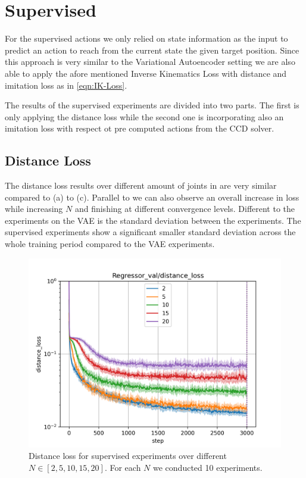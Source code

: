 \section{Supervised}

For the supervised actions we only relied on state information as the input to predict an action to reach from the current state the given target position.  Since this approach is very similar to the Variational Autoencoder setting we are also able to apply the afore mentioned Inverse Kinematics Loss with distance and imitation loss as in \eqref{eqn:IK-Loss}.

The results of the supervised experiments are divided into two parts. The first is only applying the distance loss while the second one is incorporating also an imitation loss with respect ot pre computed actions from the CCD solver.

\subsection{Distance Loss}

The distance loss results over different amount of joints in  are very similar compared to  (a) to (c). Parallel to  we can also observe an overall increase in loss while increasing $N$ and finishing at different convergence levels. Different to the experiments on the VAE is the standard deviation between the experiments. The supervised experiments show a significant smaller standard deviation across the whole training period compared to the VAE experiments.

\begin{figure}
    \begin{center}
        \includegraphics[width=0.46 \linewidth]{figures/experiments/supervised_2_distance_loss.png}
    \end{center}
    \caption[Supervised Distance Loss]{Distance loss for supervised experiments over different $N \in [2, 5, 10, 15, 20]$. For each $N$ we conducted 10 experiments. }
    \label{fig:supervised_distance}
\end{figure}


